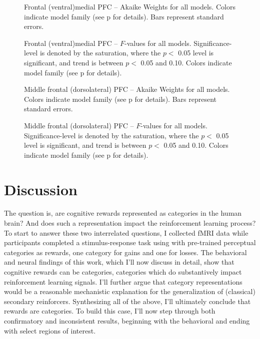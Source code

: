 \documentclass[doc,12pt]{apa}        %
\begin{document}
\begin{figure}[tp]
    \centering
    \caption{Frontal (ventral)medial PFC -- Akaike Weights for all models.  Colors indicate model family (see p\pageref{sub:cmb} for details). Bars represent standard errors.}
	\label{fig:vmpfc}
\end{figure}
\begin{figure}[tp]
    \centering
    \caption{Frontal (ventral)medial PFC -- $F$-values for all models.
    Significance-level is denoted by the saturation, where the $p <$ 0.05 level is
    significant, and trend is between $p <$ 0.05 and 0.10.  Colors indicate model family (see p\pageref{sub:cmb} for details).}
	\label{fig:fvalvmpfc}
\end{figure}

\begin{figure}[tp]
    \centering
    \caption{Middle frontal (dorsolateral) PFC -- Akaike Weights for all models.  Colors indicate model family (see p\pageref{sub:cmb} for details). Bars represent standard errors.}
	\label{fig:dlpfc}
\end{figure}
\begin{figure}[tp]
    \centering
    \caption{Middle frontal (dorsolateral) PFC -- $F$-values for all models.
    Significance-level is denoted by the saturation, where the $p <$ 0.05 level is
    significant, and trend is between $p <$ 0.05 and 0.10.  Colors indicate model family (see p\pageref{sub:cmb} for details).}
	\label{fig:fvaldlpfc}
\end{figure}
\clearpage

\newpage
\section{Discussion} %
\label{sec:dicussion}
The question is, are cognitive rewards represented as categories in the human brain?  And does such a representation impact the reinforcement learning process?  To start to answer these two interrelated questions, I collected fMRI data while participants completed a stimulus-response task using with pre-trained perceptual categories as rewards, one category for gains and one for losses.  The behavioral and neural findings of this work, which I'll now discuss in detail, show that cognitive rewards can be categories, categories which do substantively impact reinforcement learning signals.  I'll further argue that category representations would be a reasonable mechanistic explanation for the generalization of (classical) secondary reinforcers.  Synthesizing all of the above, I'll ultimately conclude that rewards are categories.  To build this case, I'll now step through both confirmatory and inconsistent results, beginning with the behavioral and ending with select regions of interest.
\end{document}
